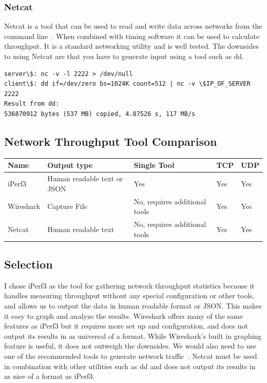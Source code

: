 \documentclass[10pt,letterpaper,onecolumn,draftclsnofoot]{IEEEtran}
\begin{document}
\subsubsection{Netcat}
Netcat is a tool that can be used to read and write data across networks from the command line~\cite{netcat}.
When combined with timing software it can be used to calculate throughput.
It is a standard networking utility and is well tested.
The downsides to using Netcat are that you have to generate input using a tool such as dd.
\begin{lstlisting}[caption = Caclulating throughput with netcat and dd~\cite{nc-example}, basicstyle=\ttfamily]
server\$: nc -v -l 2222 > /dev/null
client\$: dd if=/dev/zero bs=1024K count=512 | nc -v \$IP_OF_SERVER 2222
Result from dd:
536870912 bytes (537 MB) copied, 4.87526 s, 117 MB/s
\end{lstlisting}


\subsection{Network Throughput Tool Comparison}

\begin{center}
	\begin{tabular}{| l | l | l | l | l |}
		\hline
		Name & Output type & Single Tool & TCP & UDP \\ \hline
		iPerf3 & Human readable text or JSON & Yes & Yes & Yes \\ \hline
		Wireshark & Capture File & No, requires additional tools & Yes & Yes \\ \hline
                Netcat & Human readable text & No, requires additional tools & Yes & Yes \\ \hline
	\end{tabular}
\end{center}

\subsection{Selection}
I chose iPerf3 as the tool for gathering network throughput statistics because it handles measuring throughput without any special configuration or other tools, and allows us to output the data in human readable format or JSON.
This makes it easy to graph and analyze the results.
Wireshark offers many of the same features as iPerf3 but it requires more set up and configuration, and does not output its results in as universal of a format. 
While Wireshark's built in graphing feature is useful, it does not outweigh the downsides.
We would also need to use one of the recommended tools to generate network traffic~\cite{wireshark-tools}.
Netcat must be used in combination with other utilities such as dd and does not output its results in as nice of a format as iPerf3.
\end{document}
